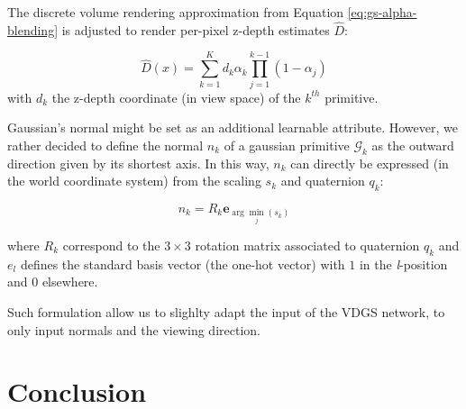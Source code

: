 The discrete volume rendering approximation from Equation \eqref{eq:gs-alpha-blending} is adjusted to render per-pixel z-depth estimates $\hat{D}$:

\begin{equation}
  \hat{D}(x) = \sum_{k=1}^{K} d_{k}\alpha_{k}\prod_{j=1}^{k-1}(1-\alpha_{j})
\end{equation}
with $d_{k}$ the z-depth coordinate (in view space) of the $k^{th}$ primitive. \newline

Gaussian's normal might be set as an additional learnable attribute. However, we rather decided to define the normal $n_{k}$ of a gaussian primitive $\mathcal{G}_{k}$ as the outward direction given by its shortest axis. In this way, $n_{k}$ can directly be expressed (in the world coordinate system) from the scaling $s_{k}$ and quaternion $q_{k}$: 

\begin{equation}
  n_{k} = R_{k}\mathbf{e}_{\arg\min_{j}(s_k)}
\end{equation}

where $R_{k}$ correspond to the $3\times 3$ rotation matrix associated to quaternion $q_{k}$ and $e_{l}$ defines the standard basis vector (the one-hot vector) with $1$ in the \textit{l}-position and $0$ elsewhere.  

Such formulation allow us to slighlty adapt the input of the \ac{VDGS} network, to only input normals and the viewing direction. 

\section{Conclusion}

